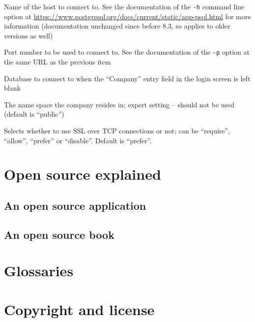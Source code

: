 \begin{description}[style=nextline]
	\item [host] Name of the host to connect to. See the documentation of the {\tt -h} command line option at 
	\url{https://www.postgresql.org/docs/current/static/app-psql.html}
	for more information (documentation unchanged since before 8.3, so applies to older versions as well)
	\item [port] Port number to be used to connect to. See the documentation of the {\tt -p} option at the
	same URL as the previous item
	\item [default\_db] Database to connect to when the ``Company'' entry field in the login screen is left blank
	\item [db\_namespace] The name space the company resides in; expert setting -- should not be used (default is
	``public'')
	\item [sslmode] Selects whether to use \gls{SSL} over TCP connections or not; can be ``require'', ``allow'',
	``prefer'' or ``disable''.  Default is ``prefer''.
\end{description}

\chapter{Open source explained}
\label{app-open-source-explained}

\section{An open source application}
\label{sec-open-source-application}

\section{An open source book}
\label{sec-open-source-book}

\chapter{Glossaries}
\label{app-glossaries}

\printglossary[type=acronym]


\chapter{Copyright and license}
\label{app-copyright-license}

